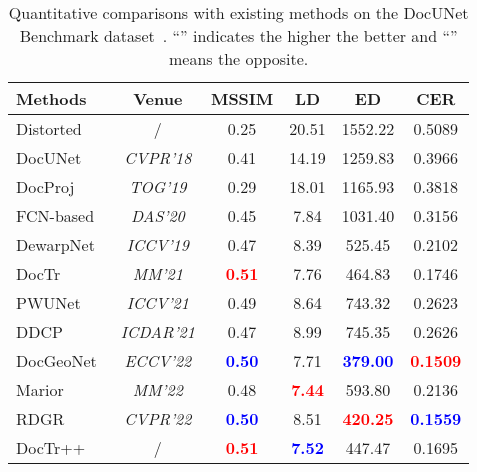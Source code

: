 \documentclass[lettersize,journal]{IEEEtran}
\begin{document}
\setlength{\tabcolsep}{1.6mm}
\begin{table}[t]
\centering
	\caption{Quantitative comparisons with existing methods on the DocUNet Benchmark dataset~\cite{8578592}. ``'' indicates the higher the better and ``'' means the opposite.}
\begin{tabular}{l|c|cccc} 
   \toprule
   \textbf{Methods} & \textbf{Venue} &\textbf{MSSIM}  &\textbf{LD}   &\textbf{ED}  &\textbf{CER}    \\ 
   \midrule
    Distorted & / & 0.25 & 20.51 & 1552.22 & 0.5089 \\
            \midrule
    DocUNet~\cite{8578592} & \emph{CVPR'18} & 0.41 & 14.19 & 1259.83 & 0.3966 \\
    DocProj~\cite{li2019document} & \emph{TOG'19} & 0.29 & 18.01  & 1165.93 & 0.3818 \\

    FCN-based~\cite{xie2020dewarping} & \emph{DAS'20}  & 0.45 & 7.84 & 1031.40 & 0.3156 \\ 

    DewarpNet~\cite{9010747} & \emph{ICCV'19}  & 0.47 & 8.39  & 525.45 & 0.2102 \\

    DocTr~\cite{feng2021doctr} & \emph{MM'21} & \textcolor{red}{\textbf{0.51}} & 7.76  & 464.83 & 0.1746 \\
    
    PWUNet~\cite{das2021end} & \emph{ICCV'21} & 0.49 & 8.64  & 743.32 & 0.2623 \\    
    
    DDCP~\cite{xie2021document}  & \emph{ICDAR'21} & 0.47 & 8.99 & 745.35 & 0.2626 \\

    DocGeoNet~\cite{feng2022geometric} & \emph{ECCV'22} & \textcolor{blue}{\textbf{0.50}} & 7.71 & \textcolor{blue}{\textbf{379.00}} & \textcolor{red}{\textbf{0.1509}} \\ 

    Marior~\cite{zhang2022marior} & \emph{MM'22} & 0.48 & \textcolor{red}{\textbf{7.44}} & 593.80 & 0.2136 \\

    RDGR~\cite{jiang2022revisiting} & \emph{CVPR'22} & \textcolor{blue}{\textbf{0.50}} & 8.51 & \textcolor{red}{\textbf{420.25}} & \textcolor{blue}{\textbf{0.1559}}  \\
        \midrule
        DocTr++ & / & \textcolor{red}{\textbf{0.51}}  & \textcolor{blue}{\textbf{7.52}} & 447.47 & 0.1695  \\
   \bottomrule
\end{tabular}
\label{tab:t1}
\end{table} 
\end{document}
